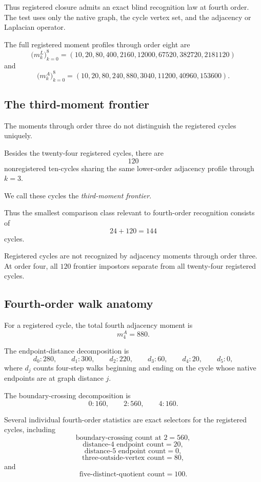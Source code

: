 Thus registered closure admits an exact blind recognition law at
fourth order. The test uses only the native graph, the cycle vertex
set, and the adjacency or Laplacian operator.

The full registered moment profiles through order eight are
\[
\bigl(m_k^L\bigr)_{k=0}^8
=
(10,20,80,400,2160,12000,67520,382720,2181120)
\]
and
\[
\bigl(m_k^A\bigr)_{k=0}^8
=
(10,20,80,240,880,3040,11200,40960,153600).
\]

\subsection{The third-moment frontier}

The moments through order three do not distinguish the registered
cycles uniquely.

Besides the twenty-four registered cycles, there are
\[
120
\]
nonregistered ten-cycles sharing the same lower-order adjacency
profile through \(k=3\).

We call these cycles the \emph{third-moment frontier}.

Thus the smallest comparison class relevant to fourth-order
recognition consists of
\[
24+120=144
\]
cycles.

\begin{proposition}
Registered cycles are not recognized by adjacency moments through
order three. At order four, all \(120\) frontier impostors separate
from all twenty-four registered cycles.
\end{proposition}

\subsection{Fourth-order walk anatomy}

For a registered cycle, the total fourth adjacency moment is
\[
m_4^A=880.
\]

The endpoint-distance decomposition is
\[
d_0:280,
\qquad
d_1:300,
\qquad
d_2:220,
\qquad
d_3:60,
\qquad
d_4:20,
\qquad
d_5:0,
\]
where \(d_j\) counts four-step walks beginning and ending on the cycle
whose native endpoints are at graph distance \(j\).

The boundary-crossing decomposition is
\[
0:160,
\qquad
2:560,
\qquad
4:160.
\]

Several individual fourth-order statistics are exact selectors for the
registered cycles, including
\[
\text{boundary-crossing count at }2=560,
\]
\[
\text{distance-4 endpoint count}=20,
\]
\[
\text{distance-5 endpoint count}=0,
\]
\[
\text{three-outside-vertex count}=80,
\]
and
\[
\text{five-distinct-quotient count}=100.
\]

